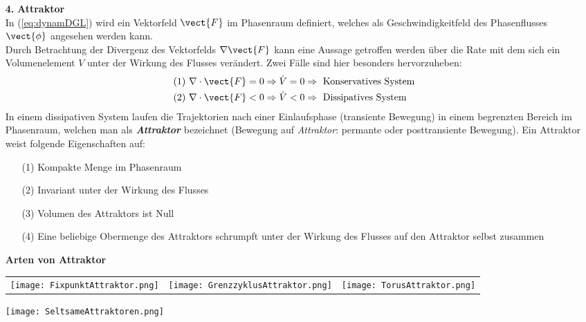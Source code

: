 \begin{itemize}
    \item[\textbf{4.}]\textbf{Attraktor}\\
    In (\ref{eq:dynamDGL}) wird ein Vektorfeld $\vect{F}$ im Phasenraum definiert, welches als Geschwindigkeitfeld des Phasenflusses $\vect{\phi}$ angesehen werden kann.\\ Durch Betrachtung der Divergenz des Vektorfelds $\nabla\vect{F}$ kann eine Aussage getroffen werden über die Rate mit dem sich ein Volumenelement $V$ unter der Wirkung des Flusses verändert. Zwei Fälle sind hier besonders hervorzuheben:
    \begin{gather}
        \begin{aligned}
            (1)~&\nabla\cdot\vect{F}=0\Rightarrow \dot{V}=0 \Rightarrow~\text{Konservatives System}\\
            (2)~&\nabla\cdot\vect{F}<0\Rightarrow \dot{V}<0 \Rightarrow~\text{Dissipatives System}
        \end{aligned}
    \end{gather}
    In einem dissipativen System laufen die Trajektorien nach einer Einlaufsphase (transiente Bewegung) in einem begrenzten Bereich im Phasenraum, welchen man als \textit{\textbf{Attraktor}} bezeichnet (Bewegung auf \textit{Attraktor}: permante oder posttransiente Bewegung). Ein Attraktor weist folgende Eigenschaften auf:
    \begin{itemize}
        \item[(1)] Kompakte Menge im Phasenraum
        \item[(2)] Invariant unter der Wirkung des Flusses
        \item[(3)] Volumen des Attraktors ist Null
        \item[(4)] Eine beliebige Obermenge des Attraktors schrumpft unter der Wirkung des Flusses auf den Attraktor selbst zusammen   
    \end{itemize}
    \textbf{Arten von Attraktor}
    \begin{center}
        \begin{tabular}{ccc}
            \texttt{[image: FixpunktAttraktor.png]}
            & \texttt{[image: GrenzzyklusAttraktor.png]}
            & \texttt{[image: TorusAttraktor.png]}
        \end{tabular}
        \texttt{[image: SeltsameAttraktoren.png]}
    \end{center}
\end{itemize}

